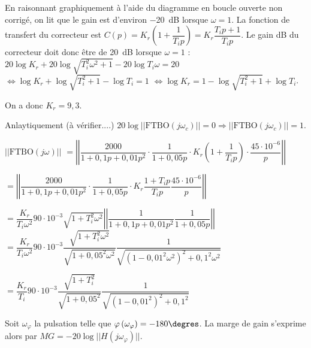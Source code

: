 \ifprof
\begin{corrige}
En raisonnant graphiquement à l'aide du diagramme en boucle ouverte non corrigé, on lit que le gain est d'environ \SI{-20}{dB} lorsque $\omega=1$. La fonction de transfert du correcteur est 
$C(p)=K_r  \left(1+\dfrac{1}{T_i p} \right)=K_r  \dfrac{T_i p+1}{T_i p} $. Le gain dB du correcteur doit donc être de \SI{20}{dB} lorsque $\omega=1$ :
$20\log K_r  +20\log \sqrt{T_i^2 \omega^2 + 1}- 20\log T_i \omega =20$
$\Leftrightarrow \log K_r  +\log \sqrt{T_i^2  + 1}- \log T_i  =1$
$\Leftrightarrow \log K_r   =1-\log \sqrt{T_i^2  + 1}+ \log T_i $. 

On a donc $K_r = 9,3$. 

\vspace{1cm}
Anlaytiquement (à vérifier....)
$20\log||\text{FTBO}(j\omega_c)||=0 \Rightarrow ||\text{FTBO}(j\omega_c)||=1$.

$\left|\left| \text{FTBO}\left( j \omega\right)\right|\right|$ 
$ = \left|\left|
{\dfrac{2000}{1+0,1p+0,01p^2}}
\cdot
{\dfrac{1}{1+0,05p}}
\cdot 
{K_r}
 \left(1+\dfrac{1}{T_i p} \right) \cdot 
\dfrac{45\cdot 10^{-6}}{p}
\right|\right| $

$ = \left|\left|
{\dfrac{2000}{1+0,1p+0,01p^2}}
\cdot
{\dfrac{1}{1+0,05p}}
\cdot 
{K_r}
 \dfrac{1+T_i p}{T_i p} 
\dfrac{45\cdot 10^{-6}}{p}
\right|\right| $

$ =  \dfrac{K_r}{T_i\omega^2}  90\cdot 10^{-3}  \sqrt{1+T_i^2\omega^2}\left|\left|
\dfrac{1}{1+0,1p+0,01p^2}
\dfrac{1}{1+0,05p}
\right|\right| $
$ =  \dfrac{K_r}{T_i\omega^2}  90\cdot 10^{-3}  
\dfrac{\sqrt{1+T_i^2\omega^2}}{\sqrt{1+0,05^2 \omega^2}}
\dfrac{1}{\sqrt{\left(1-0,01^2\omega^2\right)^2+0,1^2\omega^2}} $

$ =  \dfrac{K_r}{T_i}  90\cdot 10^{-3}  
\dfrac{\sqrt{1+T_i^2}}{\sqrt{1+0,05^2 }}
\dfrac{1}{\sqrt{\left(1-0,01^2\right)^2+0,1^2}} $

\end{corrige}
\else
\fi


\begin{methode}
Soit $\omega_{\varphi}$ la pulsation telle que $\varphi\left(\omega_{\varphi} \right)=-180\degres$. La marge de gain s'exprime alors par $MG=-20\log||H\left(j \omega_{\varphi} \right)||$.
\end{methode}


